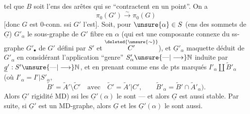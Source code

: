tel que $B$ soit l'ens des arêtes  qui se ``contractent en un point''. On a
\[
\pi_0(G')\overset{\sim}{\longrightarrow}\pi_0(G)
\]
[donc $G$ est $0$-conn. ssi $G'$ l'est].  Soit, pour  $\unsure{\alpha}\in S$ (ens des sommets de $\underline{G}$) $G'_\alpha$ le sous-graphe de $G'$ fibre en $\alpha$ (qui est une composante connexe du ss-graphe $G'_\bullet$ de $G'$ défini par $S'$ et $\overset{\deleted{\unsure{\sim}}}{C'}$), et $\underline{G}'_\alpha$  maquette déduit de $G'_\alpha$ en considérant l'application ``genre'' $S'_\alpha\unsure{\mathbin{\text{---}}|\longrightarrow}\mathbb N$ induite par $\underline{g}':S'\unsure{\mathbin{\text{---}}|\longrightarrow}\mathbb N$, et en prenant comme ens de pts marqués $I'_\alpha\amalg\widetilde{B}'_\alpha$ (où $I'_\alpha=I'|S'_\alpha$,
\[
\widetilde{B}'=\widetilde{A}'\setminus\widetilde{C}'\quad\text{avec}\quad
\widetilde{C}'=\widetilde{A}'|C',\qquad
\widetilde{B}'_\alpha=\widetilde{B}'\cap\widetilde{A}'_\alpha).
\]
Alors $\underline{G}'$   rigidité MD) ssi les $\underline{G}'(\alpha)$ le sont --- et alors $\underline{G}$ est aussi stable. Par suite, si $\underline{G}'$ est un MD-graphe, alors $\underline{G}$ et les $\underline{G}'(\alpha)$ le sont aussi.
